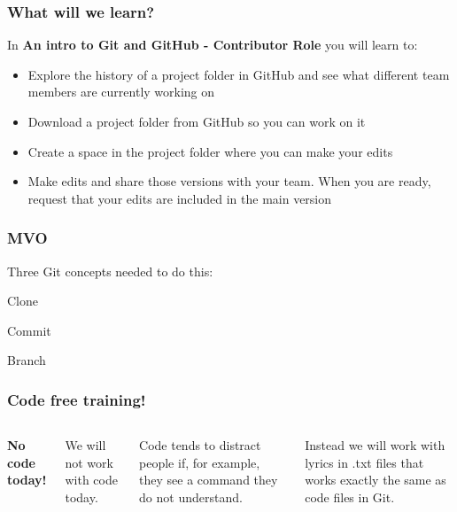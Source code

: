 \documentclass[aspectratio=169]{beamer} %
\begin{document}
\begin{frame}
\begin{columns}[c]
	\end{columns}
\end{frame}




\begin{frame}
\frametitle{What will we learn?}

	In \textbf{An intro to Git and GitHub - Contributor Role} you will learn to:

	\begin{itemize}
		\item Explore the history of a project folder in GitHub and see what different team members are currently working on
		\item Download a project folder from GitHub so you can work on it
		\item Create a space in the project folder where you can make your edits
		\item Make edits and share those versions with your team. When you are ready, request that your edits are included in the main version
	\end{itemize}

\end{frame}


\begin{frame}
\frametitle{MVO}

	\hspace*{2.5cm}\Large{Three Git concepts needed to do this:}

	\begin{itemize}
		\setlength{\itemindent}{3cm}
		\Large{\item Clone}
		\Large{\item Commit}
		\Large{\item Branch}
	\end{itemize}

\end{frame}


\begin{frame}
\frametitle{Code free training!}

	\begin{columns}[c]


		\textbf{No code today!}

		\vspace{.5cm}

		We will not work with code today.

		\vspace{.25cm}

		Code tends to distract people if, for example, they see a command they do not understand.

		\vspace{.25cm}

		Instead we will work with lyrics in .txt files that works exactly the same as code files in Git.


	\end{columns}
\end{frame}
\end{document}
